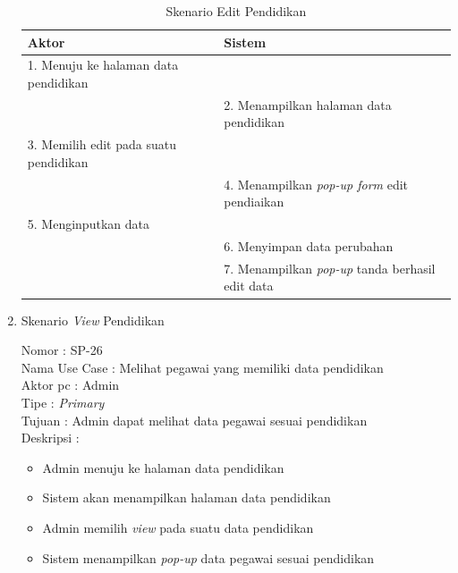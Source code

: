 \begin{enumerate}
\begin{itemize}
\end{itemize}

\begin{table}
	\caption{Skenario Edit Pendidikan}
	\centering
	\begin{tabular}{ | p{67mm} | p{61mm} |}
		\hline 
		\textbf{Aktor} & \textbf{Sistem} \\
		\hline
		
		1.	Menuju ke halaman data pendidikan &  \\
		
		\hline
		
		&  2.	Menampilkan halaman data pendidikan \\
		
		\hline
		
		3. Memilih edit pada suatu pendidikan & \\
		
		\hline
		
		& 4.	Menampilkan \textit{pop-up form} edit pendiaikan \\
		
		\hline
		
		5.	Menginputkan data  & \\
		\hline
		
		& 6.	Menyimpan data perubahan \\
		\hline
		
		& 7.	Menampilkan \textit{pop-up} tanda berhasil edit data \\
		\hline
		
	\end{tabular}
\end{table}

\item Skenario \textit{View} Pendidikan

Nomor \kern 3.6pc : SP-26 \\
Nama Use Case : Melihat pegawai yang memiliki data pendidikan \\
Aktor  pc : Admin \\
Tipe \kern 4.6pc : \textit{Primary} \\
Tujuan \kern 3.6pc : Admin dapat melihat data pegawai sesuai pendidikan \\
Deskripsi \kern 2.5pc : 

\begin{itemize}
	\item Admin menuju ke halaman data pendidikan
	\item Sistem akan menampilkan halaman data pendidikan
	\item Admin memilih \textit{view} pada suatu data pendidikan
	\item Sistem menampilkan \textit{pop-up} data pegawai sesuai pendidikan 
	

\end{itemize}
\end{enumerate}
